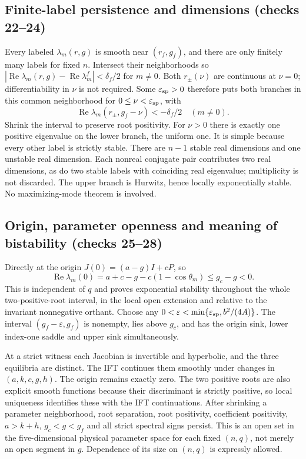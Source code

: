 \documentclass[11pt]{article}
\newcommand{\Ree}{\operatorname{Re}}
\begin{document}
\subsection{Finite-label persistence and dimensions (checks 22--24)}
Every labeled $\lambda_m(r,g)$ is smooth near $(r_f,g_f)$, and there are
only finitely many labels for fixed $n$. Intersect their neighborhoods so
$|\Ree\lambda_m(r,g)-\Ree\lambda_m^f|<\delta_f/2$ for $m\ne0$.
Both $r_\pm(\nu)$ are continuous at $\nu=0$; differentiability in $\nu$
is not required. Some $\varepsilon_{\rm sp}>0$ therefore puts both branches
in this common neighborhood for $0\le\nu<\varepsilon_{\rm sp}$, with
\[
 \Ree\lambda_m(r_\pm,g_f-\nu)<-\delta_f/2\quad(m\ne0).
\]
Shrink the interval to preserve root positivity. For $\nu>0$ there is exactly
one positive eigenvalue on the lower branch, the uniform one. It is simple
because every other label is strictly stable. There are $n-1$ stable real
dimensions and one unstable real dimension. Each nonreal conjugate pair
contributes two real dimensions, as do two stable labels with coinciding
real eigenvalue; multiplicity is not discarded. The upper branch is Hurwitz,
hence locally exponentially stable. No maximizing-mode theorem is involved.

\subsection{Origin, parameter openness and meaning of bistability (checks 25--28)}
Directly at the origin $J(0)=(a-g)I+cP$, so
\[
 \Ree\lambda_m(0)=a+c-g-c(1-\cos\theta_m)
 \le g_c-g<0.
\]
This is independent of $q$ and proves exponential stability throughout the
whole two-positive-root interval, in the local open extension and relative
to the invariant nonnegative orthant. Choose any
$0<\varepsilon<\min\{\varepsilon_{\rm sp},b^2/(4A)\}$.
The interval $(g_f-\varepsilon,g_f)$ is nonempty, lies above $g_c$, and has
the origin sink, lower index-one saddle and upper sink simultaneously.

At a strict witness each Jacobian is invertible and hyperbolic, and the three
equilibria are distinct. The IFT continues them smoothly under changes in
$(a,k,c,g,h)$. The origin remains exactly zero. The two positive roots are
also explicit smooth functions because their discriminant is strictly
positive, so local uniqueness identifies these with the IFT continuations.
After shrinking a parameter neighborhood, root separation, root positivity,
coefficient positivity, $a>k+h$, $g_c<g<g_f$ and all strict spectral signs
persist. This is an open set in the five-dimensional physical parameter
space for each fixed $(n,q)$, not merely an open segment in $g$.
Dependence of its size on $(n,q)$ is expressly allowed.
\end{document}
